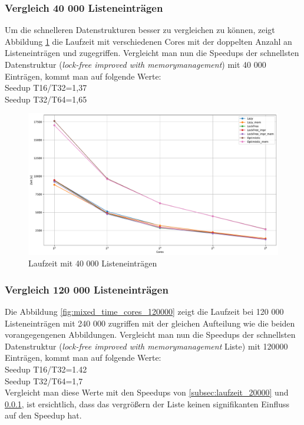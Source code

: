  \subsubsection{Vergleich 40 000 Listeneinträgen}
 \label{subsub:Vergleich_40000}
 Um die schnelleren Datenstrukturen besser zu vergleichen zu können, zeigt Abbildung \ref{fig:mixed_time_cores_40000} die Laufzeit mit verschiedenen Cores
mit der doppelten Anzahl an Listeneinträgen und zugegriffen. 
Vergleicht man nun die Speedups der schnellsten Datenstruktur (\textit{lock-free improved with memorymanagement})
mit 40 000 Einträgen, kommt man auf folgende Werte:
\\Seedup T16/T32=1,37
\\Seedup T32/T64=1,65


\begin{figure}[H]
	\centering
	\includegraphics[width=1.0\linewidth]{./plots_pdf/mixed_time_cores_40000.pdf} 
	\caption{Laufzeit mit 40 000 Listeneinträgen}
	\label{fig:mixed_time_cores_40000} 
\end{figure}

\subsubsection{Vergleich 120 000 Listeneinträgen}
Die Abbildung \ref{fig:mixed_time_cores_120000} zeigt die Laufzeit bei
120 000 Listeneinträgen mit 240 000 zugriffen mit der gleichen Aufteilung wie die beiden vorangegengenen Abbildungen.
Vergleicht man nun die Speedups der schnellsten Datenstruktur (\textit{lock-free improved with memorymanagement} Liste)
mit 120000 Einträgen, kommt man auf folgende Werte:
\\Seedup T16/T32=1.42
\\Seedup T32/T64=1,7
\\ Vergleicht man diese Werte mit den Speedups von \ref{subsec:laufzeit_20000} und \ref{subsub:Vergleich_40000}, 
ist ersichtlich, dass das vergrößern der Liste keinen signifikanten Einfluss auf den Speedup hat. 



